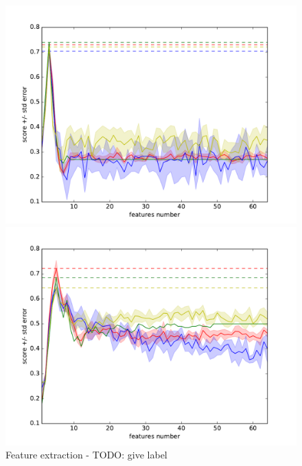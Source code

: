 \begin{figure}
\centering
\begin{minipage}{.5\textwidth}

\centering
\includegraphics[scale=\fesize]{res/digits_600_all_LinearDiscriminantAnalysis.pdf}

  
\end{minipage}%
\begin{minipage}{.5\textwidth}

\centering
\includegraphics[scale=\fesize]{res/digits_600_all_PCA.pdf}
  
\end{minipage}
\caption[Caption for LOF]{Feature extraction - TODO: give label\label{higgsall}}
\end{figure}



